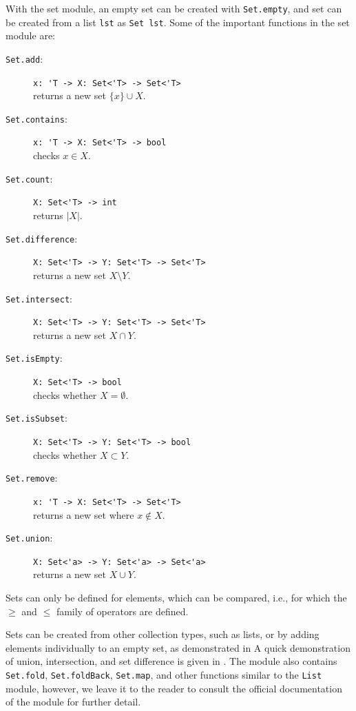 \documentclass[fsharpNotes.tex]{subfiles}
\begin{document}
With the set module, an empty set can be created with \lstinline{Set.empty}, and set can be created from a list \lstinline{lst} as \lstinline{Set lst}. Some of the important functions in the set module are:
\begin{description}
\item[\texttt{Set.add}:] \lstinline{x: 'T -> X: Set<'T> -> Set<'T>}~\\ returns a new set $\{x\}\cup X$.
\item[\texttt{Set.contains}:] \lstinline{x: 'T -> X: Set<'T> -> bool}~\\ checks $x \in X$.
\item[\texttt{Set.count}:] \lstinline{X: Set<'T> -> int}~\\ returns $|X|$.
\item[\texttt{Set.difference}:] \lstinline{X: Set<'T> -> Y: Set<'T> -> Set<'T>}~\\ returns a new set $X\setminus Y$.
\item[\texttt{Set.intersect}:] \lstinline{X: Set<'T> -> Y: Set<'T> -> Set<'T>}~\\ returns a new set $X\cap Y$.
\item[\texttt{Set.isEmpty}:] \lstinline{X: Set<'T> -> bool}~\\ checks whether $X=\emptyset$.
\item[\texttt{Set.isSubset}:] \lstinline{X: Set<'T> -> Y: Set<'T> -> bool}~\\ checks whether $X\subset Y$.
\item[\texttt{Set.remove}:] \lstinline{x: 'T -> X: Set<'T> -> Set<'T>}~\\ returns a new set where $x\not\in X$.
\item[\texttt{Set.union}:] \lstinline{X: Set<'a> -> Y: Set<'a> -> Set<'a>}~\\ returns a new set $X\cup Y$.
\end{description}
Sets can only be defined for elements, which can be compared, i.e., for which the $\ge$ and $\le$ family of operators are defined.

Sets can be created from other collection types, such as lists, or by adding elements individually to an empty set, as demonstrated in 
%
%
A quick demonstration of union, intersection, and set difference is given in .
%
%
The module also contains \lstinline{Set.fold}, \lstinline{Set.foldBack}, \lstinline{Set.map}, and other functions similar to the \lstinline{List} module, however, we leave it to the reader to consult the official documentation of the module for further detail.
\end{document}
